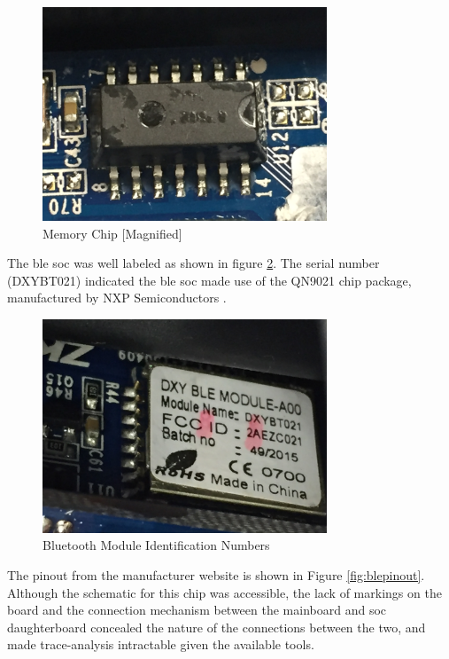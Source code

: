 \documentclass[conference]{IEEEtran}
\begin{document}
\begin{figure}[ht]
  \includegraphics[width=8.5cm]{images/MemoryChip.JPG}
  \caption{Memory Chip [Magnified]}
  \label{fig:memory}
\end{figure}

The \gls{ble} \gls{soc} was well labeled as shown in figure \ref{fig:blechip}. The serial number (DXYBT021) indicated the \gls{ble} \gls{soc} made use of the QN9021 chip package, manufactured by NXP Semiconductors \cite{NXPSemiconductors2018}. 

\begin{figure}[ht]
  \includegraphics[width=8.5cm]{images/BLEChipText2.jpg}
  \caption{Bluetooth Module Identification Numbers}
  \label{fig:blechip}
\end{figure}

The pinout from the manufacturer website is shown in Figure \ref{fig:blepinout}. Although the schematic for this chip was accessible, the lack of markings on the board and the connection mechanism between the mainboard and \gls{soc} daughterboard concealed the nature of the connections between the two, and made trace-analysis intractable given the available tools.
\end{document}
